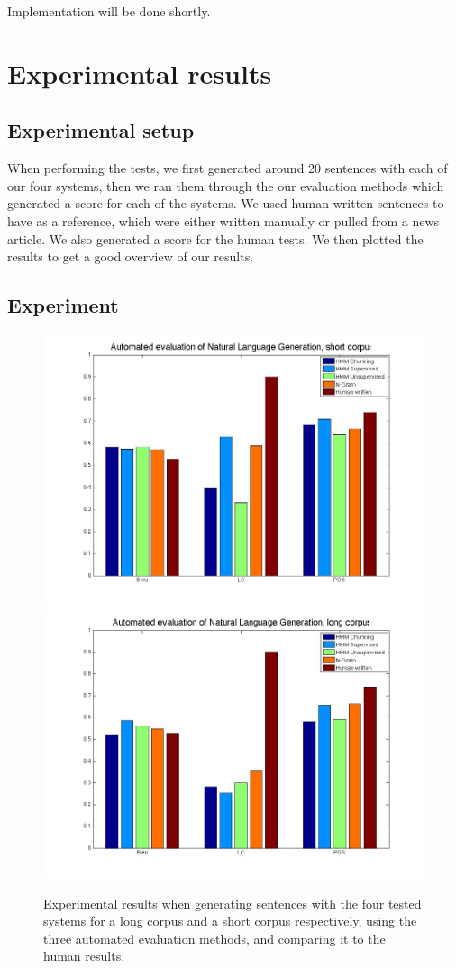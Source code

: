 \documentclass[a4paper,12pt]{article}
\begin{document}
Implementation will be done shortly.

\section{Experimental results}
\label{sec:exps}

\subsection{Experimental setup}

When performing the tests, we first generated around 20 sentences with each of our four systems, then we ran them through the our
evaluation methods which generated a score for each of the systems. We used human written sentences to have as a
reference, which were either written manually or pulled from a news article. We also generated a score for the human tests.
We then plotted the results to get a good overview of our results.
\subsection{Experiment}

\begin{figure}
\centering
\includegraphics[width=0.8\linewidth]{resultsShort}
\includegraphics[width=0.8\linewidth]{results}
\caption{Experimental results when generating sentences with the four tested systems for a long corpus and a short corpus respectively, 
using the three automated evaluation methods, and comparing it to the human results.}
\label{fig:longresults}
\end{figure}
\end{document}
